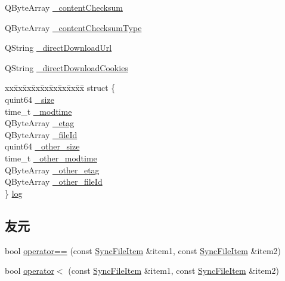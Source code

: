 \begin{DoxyCompactItemize}
Q\+Byte\+Array \hyperlink{class_o_c_c_1_1_sync_file_item_a30fe28c094c422f44801babd8e63deec}{\+\_\+content\+Checksum}
\item 
Q\+Byte\+Array \hyperlink{class_o_c_c_1_1_sync_file_item_a4e5df1284e1585f9ad6fc1f38b32f272}{\+\_\+content\+Checksum\+Type}
\item 
Q\+String \hyperlink{class_o_c_c_1_1_sync_file_item_a8119d1b7defae85c2d9405c38c25ec11}{\+\_\+direct\+Download\+Url}
\item 
Q\+String \hyperlink{class_o_c_c_1_1_sync_file_item_aa5e81ae32b653c030445b9f8e1fdcae5}{\+\_\+direct\+Download\+Cookies}
\item 
\begin{tabbing}
xx\=xx\=xx\=xx\=xx\=xx\=xx\=xx\=xx\=\kill
struct \{\\
\>quint64 \hyperlink{class_o_c_c_1_1_sync_file_item_a53664d84166d3e6bd8e1d334b6f2a355}{\_size}\\
\>time\_t \hyperlink{class_o_c_c_1_1_sync_file_item_a900721b9ac04021aee2cc69e03d5840b}{\_modtime}\\
\>QByteArray \hyperlink{class_o_c_c_1_1_sync_file_item_afd0a1a1e591ba7b3f86808ac156903a4}{\_etag}\\
\>QByteArray \hyperlink{class_o_c_c_1_1_sync_file_item_a39c091685bafa9d4a80e16ed0271115e}{\_fileId}\\
\>quint64 \hyperlink{class_o_c_c_1_1_sync_file_item_ada676cd317af2a37aa40a8c4b96a7dcc}{\_other\_size}\\
\>time\_t \hyperlink{class_o_c_c_1_1_sync_file_item_ade922396965a8a23e7502ac053d29196}{\_other\_modtime}\\
\>QByteArray \hyperlink{class_o_c_c_1_1_sync_file_item_a19b25141360821eca16bf016c75d9315}{\_other\_etag}\\
\>QByteArray \hyperlink{class_o_c_c_1_1_sync_file_item_ae5a3588c7244ea4899e27aa727dc6f03}{\_other\_fileId}\\
\} \hyperlink{class_o_c_c_1_1_sync_file_item_a4ce17b41b823e489e5e6bbf651b5f1c2}{log}\\

\end{tabbing}\end{DoxyCompactItemize}
\subsection*{友元}
\begin{DoxyCompactItemize}
\item 
bool \hyperlink{class_o_c_c_1_1_sync_file_item_a6c22b37e5da92ad2e7655c43fce5f335}{operator==} (const \hyperlink{class_o_c_c_1_1_sync_file_item}{Sync\+File\+Item} \&item1, const \hyperlink{class_o_c_c_1_1_sync_file_item}{Sync\+File\+Item} \&item2)
\item 
bool \hyperlink{class_o_c_c_1_1_sync_file_item_a5604437c536b0d80a805371dd6560739}{operator$<$} (const \hyperlink{class_o_c_c_1_1_sync_file_item}{Sync\+File\+Item} \&item1, const \hyperlink{class_o_c_c_1_1_sync_file_item}{Sync\+File\+Item} \&item2)
\end{DoxyCompactItemize}


